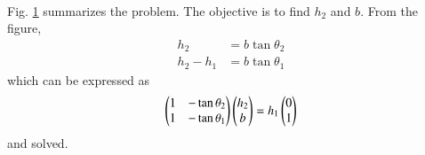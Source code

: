 \begin{enumerate}[label=\arabic*.,ref=\thesubsection.\theenumi]
\begin{figure}[!ht]
\caption{}
\label{fig:trig_pg6}
\end{figure}
%
\\
\solution Fig. \ref{fig:trig_pg6} summarizes the problem. The objective is to find $h_2$ and $b$.  From the figure, 
%
\begin{align}
h_2 &= b\tan \theta_2
\\
h_2-h_1 &= b\tan \theta_1
\end{align}
%
which can be expressed as
%
\begin{align}
\begin{pmatrix}
 1 & -\tan\theta_2 
\\
 1 & -\tan\theta_1
\end{pmatrix}\begin{pmatrix}h_2\\b\end{pmatrix}
= h_1\begin{pmatrix}0\\1\end{pmatrix}
\end{align}
%
and solved.
\end{enumerate}
%
